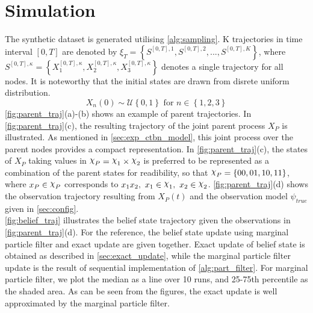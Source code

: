 \section{Simulation}
\label{sec:simulation}
The synthetic dataset is generated utilising \cref{alg:sampling}. K trajectories in time interval $ [0, T] $ are denoted by $ \xi_T = \left\lbrace S^{[0,T], 1}, S^{[0,T], 2}, ..., S^{[0,T], K} \right\rbrace  $, where $ S^{[0,T],\kappa} = \left\lbrace X_1^{[0,T],\kappa} , X_2^{[0,T],\kappa}, X_3^{[0,T],\kappa}\right\rbrace $ denotes a single trajectory for all nodes. It is noteworthy that the initial states are drawn from disrete uniform distribution.
\begin{equation}
X_n(0) \sim \mathcal{U} \left\lbrace 0, 1\right\rbrace  \text{ for } n \in \left\lbrace 1,2,3\right\rbrace 
\end{equation}
\autoref{fig:parent_traj}(a)-(b) shows an example of parent trajectories. In \autoref{fig:parent_traj}(c), the resulting trajectory of the joint parent process $ X_P $ is illustrated. As mentioned in \cref{sec:exp_ctbn_model}, this joint process over the parent nodes provides a compact representation. In \autoref{fig:parent_traj}(c), the states of $ X_P $ taking values in $ \rchi_P = \rchi_1 \times \rchi_2 $ is preferred to be represented as a combination of the parent states for readibility, so that $ \rchi_P = \left\lbrace 00, 01, 10, 11\right\rbrace  $, where $ x_P \in \rchi_P $ corresponds to $ x_1x_2,\ x_1\in \rchi_1,\  x_2\in \rchi_2 $. \autoref{fig:parent_traj}(d) shows the observation trajectory resulting from $ X_P(t) $ and the observation model $ \psi_{true} $ given in \cref{sec:config}. \\
\autoref{fig:belief_traj} illustrates the belief state trajectory given the observations in \autoref{fig:parent_traj}(d). For the reference, the belief state update using marginal particle filter and exact update are given together. Exact update of belief state is obtained as described in \cref{sec:exact_update}, while the marginal particle filter update is the result of sequential implementation of \cref{alg:part_filter}. For marginal particle filter, we plot the median as a line over 10 runs, and 25-75th percentile as the shaded area. As can be seen from the figures, the exact update is well approximated by the marginal particle filter.
